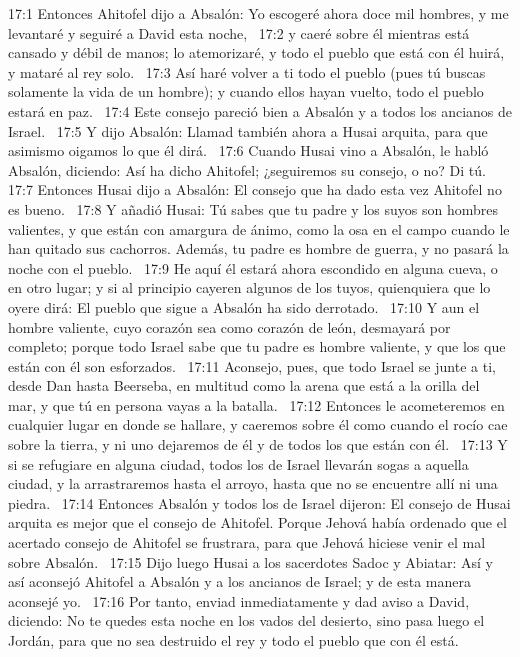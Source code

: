 17:1 Entonces Ahitofel dijo a Absalón: Yo escogeré ahora doce mil hombres, y me levantaré y seguiré a David esta noche,  
17:2 y caeré sobre él mientras está cansado y débil de manos; lo atemorizaré, y todo el pueblo que está con él huirá, y mataré al rey solo.  
17:3 Así haré volver a ti todo el pueblo (pues tú buscas solamente la vida de un hombre); y cuando ellos hayan vuelto, todo el pueblo estará en paz.  
17:4 Este consejo pareció bien a Absalón y a todos los ancianos de Israel.  
17:5 Y dijo Absalón: Llamad también ahora a Husai arquita, para que asimismo oigamos lo que él dirá.  
17:6 Cuando Husai vino a Absalón, le habló Absalón, diciendo: Así ha dicho Ahitofel; ¿seguiremos su consejo, o no? Di tú.  
17:7 Entonces Husai dijo a Absalón: El consejo que ha dado esta vez Ahitofel no es bueno.  
17:8 Y añadió Husai: Tú sabes que tu padre y los suyos son hombres valientes, y que están con amargura de ánimo, como la osa en el campo cuando le han quitado sus cachorros. Además, tu padre es hombre de guerra, y no pasará la noche con el pueblo.  
17:9 He aquí él estará ahora escondido en alguna cueva, o en otro lugar; y si al principio cayeren algunos de los tuyos, quienquiera que lo oyere dirá: El pueblo que sigue a Absalón ha sido derrotado.  
17:10 Y aun el hombre valiente, cuyo corazón sea como corazón de león, desmayará por completo; porque todo Israel sabe que tu padre es hombre valiente, y que los que están con él son esforzados.  
17:11 Aconsejo, pues, que todo Israel se junte a ti, desde Dan hasta Beerseba, en multitud como la arena que está a la orilla del mar, y que tú en persona vayas a la batalla.  
17:12 Entonces le acometeremos en cualquier lugar en donde se hallare, y caeremos sobre él como cuando el rocío cae sobre la tierra, y ni uno dejaremos de él y de todos los que están con él.  
17:13 Y si se refugiare en alguna ciudad, todos los de Israel llevarán sogas a aquella ciudad, y la arrastraremos hasta el arroyo, hasta que no se encuentre allí ni una piedra.  
17:14 Entonces Absalón y todos los de Israel dijeron: El consejo de Husai arquita es mejor que el consejo de Ahitofel. Porque Jehová había ordenado que el acertado consejo de Ahitofel se frustrara, para que Jehová hiciese venir el mal sobre Absalón.  
17:15 Dijo luego Husai a los sacerdotes Sadoc y Abiatar: Así y así aconsejó Ahitofel a Absalón y a los ancianos de Israel; y de esta manera aconsejé yo.  
17:16 Por tanto, enviad inmediatamente y dad aviso a David, diciendo: No te quedes esta noche en los vados del desierto, sino pasa luego el Jordán, para que no sea destruido el rey y todo el pueblo que con él está.  
